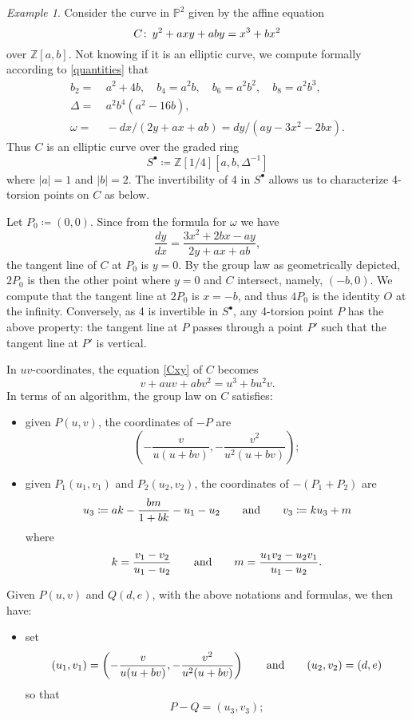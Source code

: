 \documentclass{gtpart}
\theoremstyle{definition}
\theoremstyle{remark}
\newtheorem{ex}[thm]{Example}
\def\co{\colon\thinspace}
\newcommand{\mb}[1]{\mathbb{#1}}
\newcommand{\BP}{{\mb P}}
\newcommand{\BZ}{{\mb Z}}
\newcommand{\ad}{{\rm and}}
\newcommand{\s}{S^\bullet}
\newcommand{\ce}{\coloneqq}
\numberwithin{equation}{section}
\numberwithin{thm}{section}
\begin{document}
\begin{ex}
\label{ex:C}
 Consider the curve in $\BP^2$ given by the affine equation 
 \begin{equation}
 \label{Cxy}
  C \co y^2 + a x y + a b y = x^3 + b x^2 
 \end{equation}
 over $\BZ [a, b]$.  Not knowing if it is an elliptic curve, we compute 
 formally according to \eqref{quantities} that 
 \begin{equation*}
 \begin{split}
     b_2 = & ~ a^2 + 4 b, \quad b_4 = a^2 b, \quad b_6 = a^2 b^2, \quad b_8 = a^2 b^3, \\
  \Delta = & ~ a^2 b^4 (a^2 - 16 b), \\
  \omega = & ~ -dx / (2 y + a x + a b) = dy / (a y - 3 x^2 - 2 b x).  
 \end{split}
 \end{equation*}
 Thus $C$ is an elliptic curve over the graded ring 
 \[
  \s \ce \BZ [1/4] [a, b, \Delta^{-1}] 
 \]
 where $|a| = 1$ and $|b| = 2$.  The invertibility of 4 in $\s$ allows 
 us to characterize 4-torsion points on $C$ as below.  

 Let $P_0 \ce (0,0)$.  Since from the formula for $\omega$ we have 
 \[
  \frac{dy}{dx} = \frac{3 x^2 + 2 b x - a y}{2 y + a x + a b}, 
 \]
 the tangent line of $C$ at $P_0$ is $y = 0$.  By the group law as 
 geometrically depicted, $2P_0$ is then the other point where $y = 0$ 
 and $C$ intersect, namely, $(-b,0)$.  We compute that the tangent line 
 at $2P_0$ is $x = -b$, and thus $4P_0$ is the identity $O$ at the 
 infinity.  Conversely, as 4 is invertible in $\s$, any 4-torsion point 
 $P$ has the above property: the tangent line at $P$ passes through a 
 point $P'$ such that the tangent line at $P'$ is vertical.  

 In $uv$-coordinates, the equation \eqref{Cxy} of $C$ becomes 
 \begin{equation}
 \label{Cuv}
  v + a u v + a b v^2 = u^3 + b u^2 v.  
 \end{equation}
 In terms of an algorithm, the group law on $C$ satisfies: 
 \begin{itemize}
  \item given $P(u,v)$, the coordinates of $-P$ are 
  \[
   \left( -\frac{v}{u (u + b v)},-\frac{v^2}{u^2 (u + b v)} \right); 
  \]

  \item given $P_1(u_1,v_1)$ and $P_2(u_2,v_2)$, the coordinates of 
  $-(P_1 + P_2)$ are 
  \[
   u_3 \ce a k - \frac{b m}{1 + b k} - u_1 - u_2 \qquad \ad \qquad 
   v_3 \ce k u_3 + m 
  \]
  where 
  \[
   k = \frac{v_1 - v_2}{u_1 - u_2} \qquad \ad \qquad 
   m = \frac{u_1 v_2 - u_2 v_1}{u_1 - u_2}.  
  \]
 \end{itemize}
 Given $P(u,v)$ and $Q(d,e)$, with the above notations and formulas, we 
 then have: 
 \begin{itemize}
  \item set 
  \[
   (u_1,v_1) = \left( -\frac{v}{u (u + b v)}, 
   -\frac{v^2}{u^2 (u + b v)} \right) \qquad \ad \qquad (u_2,v_2) = (d,e) 
  \]
  so that 
  \[
   P - Q = (u_3,v_3); 
  \]


\end{itemize}
\end{ex}
\end{document}
